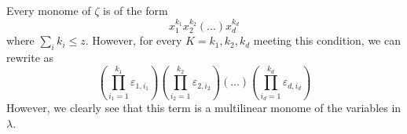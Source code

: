 \documentclass[11pt]{article}
\begin{document}
Every monome of $\zeta$  is of the form
\begin{equation}
    x_{1}^{k_1}x_{2}^{k_2}(\dots)x_{d}^{k_d}
\end{equation}
where $\sum_{i}k_i \leq z$. 
However, for every $K = {k_1, k_2, k_d}$ meeting this condition,
we can rewrite as 
\begin{equation}
    \left( \prod_{i_1=1}^{k_1}\varepsilon_{1, i_1} \right)
    \left( \prod_{i_2=1}^{k_2}\varepsilon_{2, i_2} \right)
    \left( \dots \right)
    \left( \prod_{i_d=1}^{k_d}\varepsilon_{d, i_d} \right)
\end{equation}
However, we clearly see that this term is a multilinear 
monome of the variables in $\lambda$.
\end{document}
